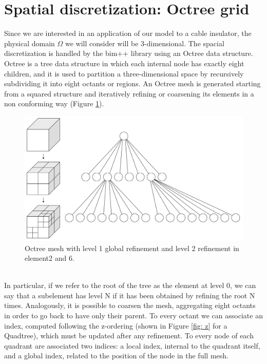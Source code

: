 \documentclass{Configuration_Files/PoliMi3i_thesis}
\begin{document}
\section{Spatial discretization: Octree grid}
Since we are interested in an application of our model to a cable insulator, the physical domain $\Omega$ we will consider will be 3-dimensional. The spacial discretization is handled by the bim++ library using an Octree data structure. Octree is a tree data structure in which each internal node has exactly eight children, and it is used to partition a three-dimensional space by recursively subdividing it into eight octants or regions. An Octree mesh is generated starting from a squared structure and iteratively refining or coarsening its elements in a non conforming way (Figure \ref{fig: octree}).
\begin{figure}[h!]
    \centering
    \includegraphics[scale=0.16]{Images/Octree2.svg.png}
    \caption {Octree mesh with level 1 global refinement and level 2 refinement in element2 and 6.}
    \label{fig: octree}
\end{figure}
\\In particular, if we refer to the root of the tree as the element at level 0, we can say that a subelement has level N if it has been obtained by refining the root N times. Analogously, it is possible to coarsen the mesh, aggregating eight octants in order to go back to have only their parent. To every octant we can associate an index, computed following the z-ordering (shown in Figure \ref{fig: z} for a Quadtree), which must be updated after any refinement. To every node of each quadrant are associated two indices: a local index, internal to the quadrant itself, and a global index, related to the position of the node in the full mesh.
\end{document}
